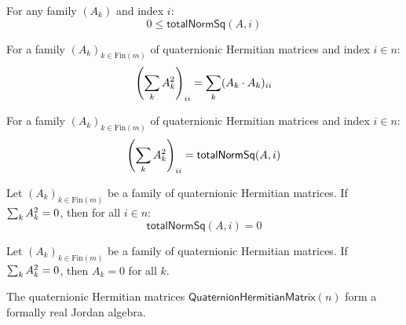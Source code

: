 \begin{lemma}
For any family $(A_k)$ and index $i$:
\[ 0 \le \mathsf{totalNormSq}(A, i) \]
\end{lemma}

\begin{theorem}
For a family $(A_k)_{k \in \mathrm{Fin}(m)}$ of quaternionic Hermitian matrices and index $i \in n$:
\[ \left(\sum_k A_k^{2}\right)_{ii} = \sum_k (A_k \cdot A_k)_{ii} \]
\end{theorem}

\begin{theorem}
For a family $(A_k)_{k \in \mathrm{Fin}(m)}$ of quaternionic Hermitian matrices and index $i \in n$:
\[ \left(\sum_k A_k^{2}\right)_{ii} = \mathsf{totalNormSq}(A, i) \]
\end{theorem}

\begin{theorem}
Let $(A_k)_{k \in \mathrm{Fin}(m)}$ be a family of quaternionic Hermitian matrices. If $\sum_k A_k^{2} = 0$, then for all $i \in n$:
\[ \mathsf{totalNormSq}(A, i) = 0 \]
\end{theorem}

\begin{theorem}
Let $(A_k)_{k \in \mathrm{Fin}(m)}$ be a family of quaternionic Hermitian matrices. If $\sum_k A_k^{2} = 0$, then $A_k = 0$ for all $k$.
\end{theorem}

\begin{proposition}[formallyReal]
The quaternionic Hermitian matrices $\mathsf{QuaternionHermitianMatrix}(n)$ form a formally real Jordan algebra.
\end{proposition}
